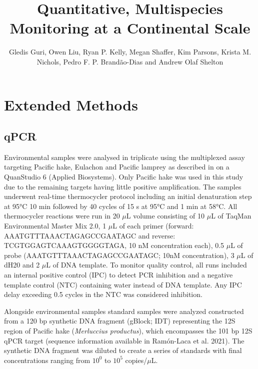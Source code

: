 \documentclass[9pt,twoside,lineno]{pnas-new}
\title{Quantitative, Multispecies Monitoring at a Continental Scale}
\author{Gledis Guri, Owen Liu, Ryan P. Kelly, Megan Shaffer, Kim Parsons, Krista M. Nichols, Pedro F. P. Brandão-Dias and Andrew Olaf Shelton}
\begin{document}
\maketitle

\SItext

\section*{Extended Methods}
\subsection*{qPCR}
Environmental samples were analysed in triplicate using the multiplexed assay targeting Pacific hake, Eulachon and Pacific lamprey as described in \cite{ramon-laca2021} on a QuanStudio 6 (Applied Biosystems). Only Pacific hake was used in this study due to the remaining targets having little positive amplification. The samples underwent real-time thermocycler protocol including an initial denaturation step at 95°C 10 min followed by 40 cycles of 15 s at 95°C and 1 min at 58°C. All thermocycler reactions were run in 20 $\mu$L volume consisting of 10 $\mu$L of TaqMan Environmental Master Mix 2.0, 1 $\mu$L of each primer (forward: AAATGTTTAAACTAGAGCCGAATAGC and reverse: TCGTGGAGTCAAAGTGGGGTAGA, 10 nM concentration each), 0.5 $\mu$L of probe (AAATGTTTAAACTAGAGCCGAATAGC; 10nM concentration), 3 $\mu$L of dH20 and 2 $\mu$L of DNA template. To monitor quality control, all runs included an internal positive control (IPC) to detect PCR inhibition and a negative template control (NTC) containing water instead of DNA template. Any IPC delay exceeding 0.5 cycles in the NTC was considered inhibition.

Alongside environmental samples standard samples were analyzed constructed from a 120 bp synthetic DNA fragment (gBlock; IDT) representing the 12S region of Pacific hake (\textit{Merluccius productus}), which encompasses the 101 bp 12S qPCR target (sequence information available in Ramón-Laca et al. 2021). The synthetic DNA fragment was diluted to create a series of standards with final concentrations ranging from $10^{0}$ to $10^{5}$ copies/$\mu$L.
\end{document}
